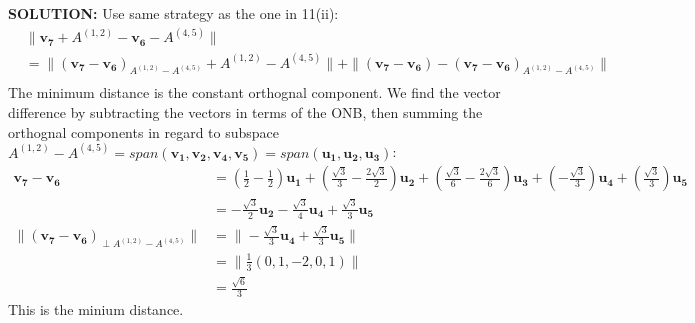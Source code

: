 \documentclass[12pt]{article}
\begin{document}
\begin{enumerate}
\begin{enumerate}
                    \textbf{SOLUTION:}
                    Use same strategy as the one in 11(ii):
                    \begin{align*}
                         & \| \mathbf{v_7} + A^{(1,2)} - \mathbf{v_6} - A^{(4,5)} \|                                                                                                              \\
                         & = \| (\mathbf{v_7 - v_6})_{A^{(1,2)} - A^{(4,5)}} + A^{(1,2)} - A^{(4,5)}\| + \|(\mathbf{v_7} - \mathbf{v_6}) - (\mathbf{v_7} - \mathbf{v_6})_{A^{(1,2)}-A^{(4,5)}} \| \\
                    \end{align*}
                    The minimum distance is the constant orthognal component.
                    We find the vector difference by subtracting the vectors in terms of the ONB,
                    then summing the orthognal components in regard to subspace \(A^{(1,2)} - A^{(4,5)} = span(\mathbf{v_1, v_2, v_4, v_5}) = span(\mathbf{u_1,u_2,u_3})\):
                    \begin{align*}
                        \mathbf{v_7-v_6}                                         & =
                        (\tfrac{1}{2}-\tfrac{1}{2}) \mathbf{u_1}
                        + (\tfrac{\sqrt{3}}{3}-\tfrac{2\sqrt{3}}{2}) \mathbf{u_2}
                        + (\tfrac{\sqrt{3}}{6}-\tfrac{2\sqrt{3}}{6}) \mathbf{u_3}
                        + (-\tfrac{\sqrt{3}}{3}) \mathbf{u_4}
                        + (\tfrac{\sqrt{3}}{3}) \mathbf{u_5}                                                                                                                                  \\
                                                                                 & =  -\tfrac{\sqrt{3}}{2} \mathbf{u_2} - \tfrac{\sqrt{3}}{4} \mathbf{u_4} + \tfrac{\sqrt{3}}{3} \mathbf{u_5} \\
                        \| (\mathbf{v_7-v_6})_{\perp{} A^{(1,2)} - A^{(4,5)}} \| & = \| - \tfrac{\sqrt{3}}{3} \mathbf{u_4} + \tfrac{\sqrt{3}}{3} \mathbf{u_5}          \|                     \\
                                                                                 & = \| \tfrac{1}{3}(0,1,-2,0,1)\|                                                                            \\
                                                                                 & = \tfrac{\sqrt{6}}{3}
                    \end{align*}
                    This is the minium distance. \\


\end{enumerate}
\end{enumerate}
\end{document}

